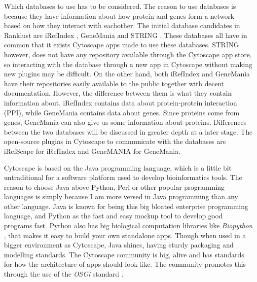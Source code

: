 \documentclass[UKenglish,11pt,a4paper]{article}
\begin{document}
Which databases to use has to be considered. The reason to use databases is because they have information about how 
protein and genes form a network based on how they interact with eachother. The initial database candidates in Ranklust 
are iRefIndex \cite{iri}, GeneMania \cite{gm} and STRING \cite{str}. These databases all have in common that it exists
Cytoscape apps made to use these databases. STRING however, does not have any repository available through the Cytoscape
app store, so interacting with the database through a new app in Cytoscape without making new plugins may be difficult.
On the other hand, both iRefIndex and GeneMania have their repositories easily available to the public together with
decent documentation. However, the difference between them is what they contain information about. iRefIndex contains
data about protein-protein interaction (PPI), while GeneMania contains data about genes.
Since proteins come from genes, GeneMania can also give us some information about proteins. Differences between the
two databases will be discussed in greater depth at a later stage.
The open-source plugins in Cytoscape to communicate with the databases are iRefScape \cite{iridb} for iRefIndex and 
GeneMANIA \cite{gmdb} for GeneMania.

Cytoscape is based on the Java programming language, which is a little bit untraditional for a software platform used to
develop bioinformatics tools. %
The reason to choose Java above Python, Perl or other popular programming languages is simply because I am more
versed in Java programming than any other language. Java is known for being this big bloated 
enterprise programming language, and Python as the fast and easy mockup tool to develop good programs fast. Python also
has big biological computation libraries like \emph{Biopython} \cite{biopython}, that makes it easy to build your own
standalone apps. Though when used in a bigger environment as Cytoscape, Java shines, having sturdy packaging and
modelling standards. The Cytoscape community is big, alive and has standards for how the architecture of apps should
look like. The community promotes this through the use of the \emph{OSGi} standard \cite{cytoscape-osgi}.
\end{document}
